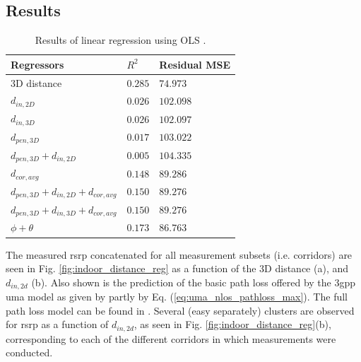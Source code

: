 \subsection{Results}

\begin{table}
    \centering
    \begin{tabular}{@{}l|ll@{}}
    \toprule
    Regressors               & $R^2$ & Residual MSE \\ \midrule
    $3$D distance              & $0.285$ & $74.973$       \\
    $d_{in,2D}$              & $\mathbf{0.026}$ & $\mathbf{102.098}$      \\
    $d_{in,3D}$              & $0.026$ & $102.097$      \\
    $d_{pen,3D}$             & $0.017$ & $103.022$      \\
    $d_{pen,3D} + d_{in,2D}$ & $0.005$ & $104.335$      \\
    $d_{cor,avg}$            & $\mathbf{0.148}$ & $\mathbf{89.286}$       \\
    $d_{pen,3D} + d_{in,2D}+d_{cor,avg}$ & $0.150$ & $89.276$       \\
    $d_{pen,3D} + d_{in,3D}+d_{cor,avg}$ & $0.150$ & $89.276$       \\
    $\phi + \theta$          & $\mathbf{0.173}$ & $\mathbf{86.763}$       \\ \bottomrule
    \end{tabular}
    \caption{Results of linear regression using OLS \cite{seabold2010statsmodels}.}\label{tab:ols_results}
    \vspace{1em}
\end{table}
\noindent The measured \gls{rsrp} concatenated for all measurement subsets (i.e. corridors) are seen in Fig. \ref{fig:indoor_distance_reg} as a function of the $3$D distance (a), and $d_{in,2d}$ (b). Also shown is the prediction of the basic path loss offered by the \gls{3gpp} \gls{uma} model as given by partly by Eq. (\ref{eq:uma_nlos_pathloss_max}). The full path loss model can be found in \cite{38211}. Several (easy separately) clusters are observed for \gls{rsrp} as a function of $d_{in,2d}$, as seen in Fig. \ref{fig:indoor_distance_reg}(b), corresponding to each of the different corridors in which measurements were conducted.

